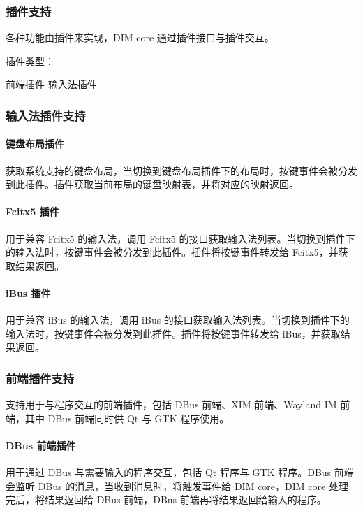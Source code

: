 \documentclass{utart}
\begin{document}
        \subsubsection{插件支持}
            \par 各种功能由插件来实现，DIM core 通过插件接口与插件交互。
            \par 插件类型：
            \begin{outline}
                \1 前端插件
                \1 输入法插件
            \end{outline}

        \subsubsection{输入法插件支持}
            \paragraph{键盘布局插件}
                \par 获取系统支持的键盘布局，当切换到键盘布局插件下的布局时，按键事件会被分发到此插件。插件获取当前布局的键盘映射表，并将对应的映射返回。

            \paragraph{Fcitx5 插件}
                \par 用于兼容 Fcitx5 的输入法，调用 Fcitx5 的接口获取输入法列表。当切换到插件下的输入法时，按键事件会被分发到此插件。插件将按键事件转发给 Fcitx5，并获取结果返回。

            \paragraph{iBus 插件}
                \par 用于兼容 iBus 的输入法，调用 iBus 的接口获取输入法列表。当切换到插件下的输入法时，按键事件会被分发到此插件。插件将按键事件转发给 iBus，并获取结果返回。

        \subsubsection{前端插件支持}
            \par 支持用于与程序交互的前端插件，包括 DBus 前端、XIM 前端、Wayland IM 前端，其中 DBus 前端同时供 Qt 与 GTK 程序使用。

            \paragraph{DBus 前端插件}
                \par 用于通过 DBus 与需要输入的程序交互，包括 Qt 程序与 GTK 程序。DBus 前端会监听 DBus 的消息，当收到消息时，将触发事件给 DIM core，DIM core 处理完后，将结果返回给 DBus 前端，DBus 前端再将结果返回给输入的程序。
\end{document}
